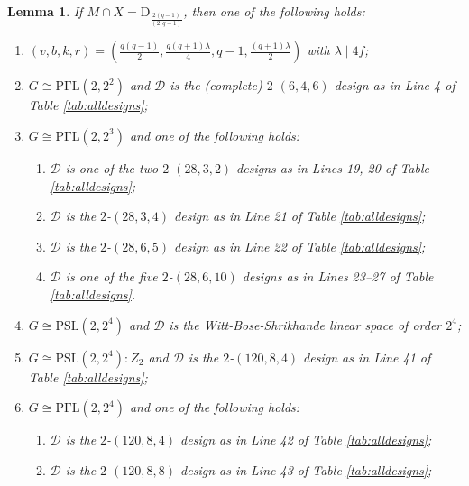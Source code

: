 \documentclass[a4paper,twopage,reqno,12pt]{amsart}
\newtheorem{lemma}[theorem]{Lemma}
\theoremstyle{definition}
\numberwithin{equation}{section}
\newcommand{\PSL}{\mathrm{PSL}}
\newcommand{\PGaL}{\mathrm{P\Gamma L}}
\newcommand{\D}{\mathrm{D}}
\renewcommand{\leq}{\leqslant}
\begin{document}
\begin{lemma}\label{MintX7}
If $M\cap X=\D_{\frac{2(q-1)}{(2,q-1)}} $, then one of the  following holds: 
\begin{enumerate}
    \item $\left(v,b,k,r\right)=\left(\frac{q(q-1)}{2},\frac{q(q+1)\lambda}{4},q-1,\frac{(q+1)\lambda}{2}\right)$ with $\lambda \mid 4f$;
    \item $G\cong \PGaL(2,2^{2})$ and $\mathcal{D}$ is the (complete) $2$-$(6,4,6)$ design as in Line 4 of Table \ref{tab:alldesigns};
    \item $G\cong \PGaL(2,2^{3})$ and one of the following holds:
    \begin{enumerate}
        \item $\mathcal{D}$ is one of the two $2$-$(28,3,2)$ designs as in Lines 19, 20 of Table \ref{tab:alldesigns}; %
        \item $\mathcal{D}$ is the $2$-$(28,3,4)$ design as in Line 21 of Table \ref{tab:alldesigns};
        \item $\mathcal{D}$ is the $2$-$(28,6,5)$ design as in Line 22 of Table \ref{tab:alldesigns};
        \item $\mathcal{D}$ is one of the five $2$-$(28,6,10)$ designs as in Lines 23--27 of Table \ref{tab:alldesigns}. 
    \end{enumerate}
    \item $G\cong \PSL(2,2^{4})$ and $\mathcal{D}$ is the Witt-Bose-Shrikhande linear space of order $2^4$;
    \item $G\cong \PSL(2,2^{4}):Z_{2}$ and $\mathcal{D}$ is the $2$-$(120,8,4)$ design as in Line 41 of Table \ref{tab:alldesigns};
     \item $G\cong \PGaL(2,2^{4})$ and one of the following holds:
     \begin{enumerate}
         \item $\mathcal{D}$ is the $2$-$(120,8,4)$ design as in Line 42 of Table \ref{tab:alldesigns};

         \item $\mathcal{D}$ is the $2$-$(120,8,8)$ design as in Line 43 of Table \ref{tab:alldesigns};
     \end{enumerate}
 \end{enumerate}
\end{lemma}
\end{document}
